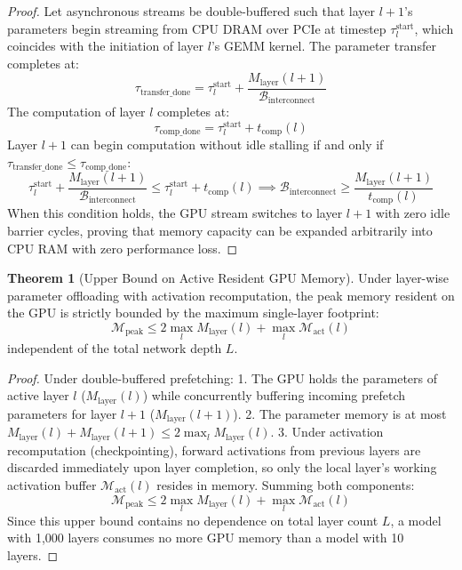 \documentclass[11pt,a4paper]{article}
\theoremstyle{definition}
\newtheorem{theorem}{\textbf{Theorem}}[section]
\begin{document}
\begin{proof}
Let asynchronous streams be double-buffered such that layer $l+1$'s parameters begin streaming from CPU DRAM over PCIe at timestep $\tau_l^{\text{start}}$, which coincides with the initiation of layer $l$'s GEMM kernel.
The parameter transfer completes at:
{\boldmath
\begin{equation}
\tau_{\text{transfer\_done}} = \tau_l^{\text{start}} + \frac{M_{\text{layer}}(l+1)}{\mathcal{B}_{\text{interconnect}}}
\end{equation}
}
The computation of layer $l$ completes at:
{\boldmath
\begin{equation}
\tau_{\text{comp\_done}} = \tau_l^{\text{start}} + t_{\text{comp}}(l)
\end{equation}
}
Layer $l+1$ can begin computation without idle stalling if and only if $\tau_{\text{transfer\_done}} \le \tau_{\text{comp\_done}}$:
{\boldmath
\begin{equation}
\tau_l^{\text{start}} + \frac{M_{\text{layer}}(l+1)}{\mathcal{B}_{\text{interconnect}}} \le \tau_l^{\text{start}} + t_{\text{comp}}(l) \implies \mathcal{B}_{\text{interconnect}} \ge \frac{M_{\text{layer}}(l+1)}{t_{\text{comp}}(l)}
\end{equation}
}
When this condition holds, the GPU stream switches to layer $l+1$ with zero idle barrier cycles, proving that memory capacity can be expanded arbitrarily into CPU RAM with zero performance loss.
\end{proof}

\begin{theorem}[Upper Bound on Active Resident GPU Memory]
Under layer-wise parameter offloading with activation recomputation, the peak memory resident on the GPU is strictly bounded by the maximum single-layer footprint:
{\boldmath
\begin{equation}
\mathcal{M}_{\text{peak}} \le 2 \max_{l} M_{\text{layer}}(l) + \max_l \mathcal{M}_{\text{act}}(l)
\end{equation}
}
independent of the total network depth $L$.
\end{theorem}

\begin{proof}
Under double-buffered prefetching:
1. The GPU holds the parameters of active layer $l$ ($M_{\text{layer}}(l)$) while concurrently buffering incoming prefetch parameters for layer $l+1$ ($M_{\text{layer}}(l+1)$).
2. The parameter memory is at most $M_{\text{layer}}(l) + M_{\text{layer}}(l+1) \le 2 \max_l M_{\text{layer}}(l)$.
3. Under activation recomputation (checkpointing), forward activations from previous layers are discarded immediately upon layer completion, so only the local layer's working activation buffer $\mathcal{M}_{\text{act}}(l)$ resides in memory.
Summing both components:
{\boldmath
\begin{equation}
\mathcal{M}_{\text{peak}} \le 2 \max_l M_{\text{layer}}(l) + \max_l \mathcal{M}_{\text{act}}(l)
\end{equation}
}
Since this upper bound contains no dependence on total layer count $L$, a model with 1,000 layers consumes no more GPU memory than a model with 10 layers.
\end{proof}
\end{document}
